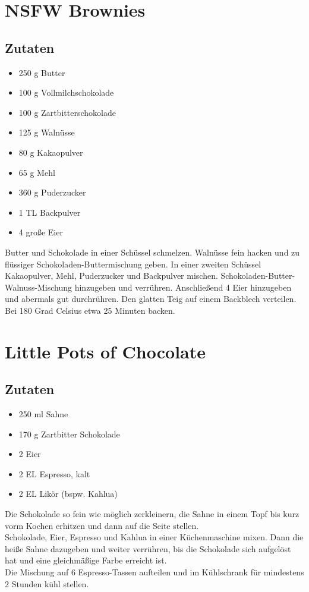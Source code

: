 \documentclass{article}
\begin{document}
\section{NSFW Brownies}
\subsection*{Zutaten}
	\begin{itemize}
		\item 250 g Butter
		\item 100 g Vollmilchschokolade
		\item 100 g Zartbitterschokolade
		\item 125 g Walnüsse
		\item 80 g Kakaopulver
		\item 65 g Mehl
		\item 360 g Puderzucker
		\item 1 TL Backpulver
		\item 4 große Eier
	\end{itemize}
	Butter und Schokolade in einer Schüssel schmelzen.
	Walnüsse fein hacken und zu flüssiger Schokoladen-Buttermischung geben.
	In einer zweiten Schüssel Kakaopulver, Mehl, Puderzucker und Backpulver mischen.
	Schokoladen-Butter-Walnuss-Mischung hinzugeben und verrühren.
	Anschließend 4 Eier hinzugeben und abermals gut durchrühren.
	Den glatten Teig auf einem Backblech verteilen.\\
	Bei 180 Grad Celsius etwa 25 Minuten backen.

\section{Little Pots of Chocolate}
\subsection*{Zutaten}
	\begin{itemize}
		\item 250 ml Sahne
		\item 170 g Zartbitter Schokolade
		\item 2 Eier
		\item 2 EL Espresso, kalt
		\item 2 EL Likör (bspw. Kahlua)
	\end{itemize}
	Die Schokolade so fein wie möglich zerkleinern,
	die Sahne in einem Topf bis kurz vorm Kochen erhitzen und dann auf die Seite stellen.\\
	Schokolade, Eier, Espresso und Kahlua in einer Küchenmaschine mixen.
	Dann die heiße Sahne dazugeben und weiter verrühren,
	bis die Schokolade sich aufgelöst hat und eine gleichmäßige Farbe erreicht ist. \\
	Die Mischung auf 6 Espresso-Tassen aufteilen und im Kühlschrank für mindestens 2 Stunden kühl stellen.
\end{document}
